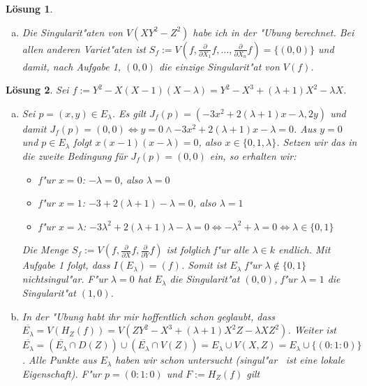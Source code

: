 \documentclass[a4paper, 12pt, numbers=noendperiod, chapterprefix=true, headsepline]{scrbook}
\theoremstyle{break}
\newtheorem{Loes}{L\"osung}
\theoremstyle{nonumberbreak}
\theoremstyle{nonumberplain}
\newcommand{\quot}[1]{\textrm{\glqq}{#1}\textrm{\grqq}}
\newcommand{\pder}[2][]{\frac{\partial #1}{\partial #2}}  %
\begin{document}
\begin{Loes}\begin{enumerate}[a)]\item
Die Singularit"aten von $V(XY^2 - Z^2)$ habe ich in der "Ubung berechnet. Bei allen anderen Variet"aten ist $S_f := V(f, \pder{X_1}{f}, \dots, \pder{X_n}{f}) = \{(0,0)\}$ und damit, nach Aufgabe 1, $(0,0)$ die einzige Singularit"at von $V(f)$.
\end{enumerate}\end{Loes}

\setcounter{Loes}{3}

\begin{Loes}
Sei $f:= Y^2 - X(X-1)(X-\lambda) = Y^2- X^3+(\lambda+1)X^2 - \lambda X$.\begin{enumerate}[a)]
\item
	Sei $p=(x,y) \in E_ {\lambda}$. Es gilt $J_f(p) = (-3x^2+2(\lambda+1)x-\lambda, 2y)$ und damit $J_f(p) = (0,0) \Leftrightarrow y = 0 \wedge -3x^2+2(\lambda +1)x - \lambda = 0$. Aus $y = 0$ und $p \in E_\lambda$ folgt $x(x-1)(x-\lambda) = 0$, also $x \in \{0,1,\lambda\}$. Setzen wir das in die zweite Bedingung für $J_f(p) = (0,0)$ ein, so erhalten wir:
	\begin{itemize}
		\item f"ur $x = 0$: $-\lambda = 0 $, also $\lambda = 0$
		\item f"ur $x = 1$: $-3+2(\lambda+1) - \lambda = 0$, also $\lambda = 1$
		\item f"ur $x = \lambda$: $-3 \lambda^2 + 2 (\lambda + 1) \lambda - \lambda = 0 \Leftrightarrow - \lambda^2 + \lambda =  0 \Leftrightarrow \lambda \in \{0,1\}$
	\end{itemize}
	Die Menge $S_f := V(f, \pder{X}{f}, \pder{Y}{f})$ ist folglich f"ur alle $\lambda \in k$ endlich. Mit Aufgabe 1 folgt, dass $I(E_\lambda) = (f)$. Somit ist $E_\lambda$ f"ur $\lambda \notin\{0,1\}$ nichtsingul"ar. F"ur $\lambda = 0$ hat $E_ \lambda$ die Singularit"at $(0,0)$, f"ur $\lambda = 1$ die Singularit"at $(1,0)$.
\item
	In der "Ubung habt ihr mir hoffentlich schon geglaubt, dass $\overline{E_\lambda} =  V (H_Z(f)) = V(ZY^2 - X^3 + (\lambda+1) X^2Z - \lambda X Z^2)$. Weiter ist $\overline{E_\lambda} = (\overline{E_\lambda} \cap D(Z) ) \cup (\overline{E_\lambda} \cap V(Z)) = E_\lambda \cup V(X,Z) = E_\lambda \cup \{(0:1:0)\}$. Alle Punkte aus $E_\lambda$ haben wir schon untersucht (\quot{singul"ar} \, ist eine lokale Eigenschaft). F"ur $p=(0:1:0)$ und $F := H_Z(f)$ gilt
	\begin{eqnarray*}

\end{eqnarray*}
\end{enumerate}
\end{Loes}
\end{document}
